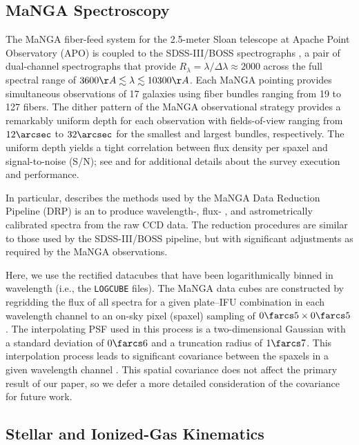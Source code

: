 \documentclass[apj,iop,revtex4,numberedappendix]{emulateapj}
\begin{document}
\subsection{MaNGA Spectroscopy}

The MaNGA fiber-feed system \citet{2015AJ....149...77D} for the
2.5-meter Sloan telescope at Apache Point Observatory (APO) is coupled
to the SDSS-III/BOSS spectrographs \citep{2013AJ....146...32S}, a pair
of dual-channel spectrographs that provide $R_\lambda =
\lambda/\Delta\lambda \approx 2000$ across the full spectral range of
$3600\AA \lesssim \lambda \lesssim 10300\AA$.  Each MaNGA pointing
provides simultaneous observations of 17 galaxies using fiber bundles
ranging from 19 to 127 fibers.  The dither pattern of the MaNGA
observational strategy \citep{2015AJ....150...19L} provides a remarkably
uniform depth for each observation with fields-of-view ranging from
$12\arcsec$ to $32\arcsec$ for the smallest and largest bundles,
respectively.  The uniform depth yields a tight correlation between flux
density per spaxel and signal-to-noise (S/N); see
\citet{2015AJ....150...19L, 2016AJ....152...83L} and
\citet{2016AJ....151....8Y, 2016AJ....152..197Y} for additional details
about the survey execution and performance.

In particular, \citet{2016AJ....152...83L} describes the methods used by
the MaNGA Data Reduction Pipeline (DRP) is an to produce wavelength-,
flux- \citep{2016AJ....151....8Y}, and astrometrically calibrated
spectra from the raw CCD data.  The reduction procedures are similar to
those used by the SDSS-III/BOSS pipeline, but with significant
adjustments as required by the MaNGA observations.  

Here, we use the rectified datacubes that have been logarithmically
binned in wavelength (i.e., the \verb|LOGCUBE| files).  The MaNGA data
cubes are constructed by regridding the flux of all spectra for a given
plate--IFU combination in each wavelength channel to an on-sky pixel
(spaxel) sampling of $0\farcs5\times0\farcs5$.  The interpolating PSF
used in this process is a two-dimensional Gaussian with a standard
deviation of $0\farcs6$ and a truncation radius of $1\farcs7$.  This
interpolation process leads to significant covariance between the
spaxels in a given wavelength channel \citep{2016AJ....152...83L}.  This
spatial covariance does not affect the primary result of our paper, so
we defer a more detailed consideration of the covariance for future
work.

\subsection{Stellar and Ionized-Gas Kinematics}
\end{document}
